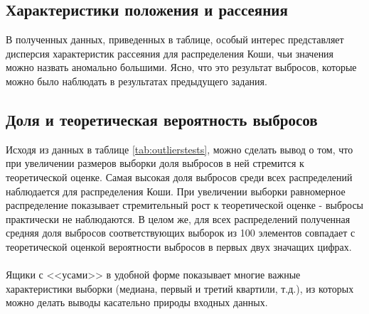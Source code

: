 \documentclass[a4paper]{article}
\begin{document}
\subsection{Характеристики положения и рассеяния}
В полученных данных, приведенных в таблице, особый интерес представляет дисперсия характеристик рассеяния для распределения Коши, чьи значения можно назвать аномально большими. Ясно, что это результат выбросов, которые можно было наблюдать в результатах предыдущего задания.
\subsection{Доля и теоретическая вероятность выбросов}
Исходя из данных в таблице \ref{tab:outlierstests}, можно сделать вывод о том, что при увеличении размеров выборки доля выбросов в ней стремится к теоретической оценке. Самая высокая доля выбросов среди всех распределений наблюдается для распределения Коши. При увеличении выборки равномерное распределение показывает стремительный рост к теоретической оценке - выбросы практически не наблюдаются. В целом же, для всех распределений полученная средняя доля выбросов соответствующих выборок из 100 элементов совпадает с теоретической оценкой вероятности выбросов в первых двух значащих цифрах.\\\\
Ящики с <<усами>> в удобной форме показывает многие важные характеристики выборки (медиана, первый и третий квартили, т.д.), из которых можно делать выводы касательно природы входных данных.
\end{document}
